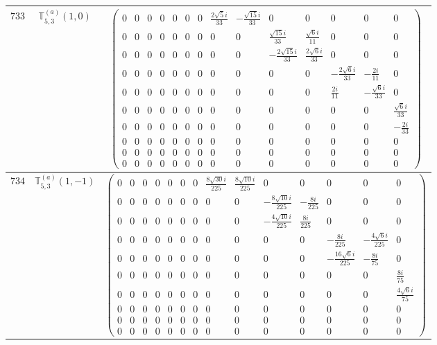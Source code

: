 \documentclass[fleqn,8pt,landscape]{jsarticle}
\begin{document}
\begin{center}
\begin{longtable}{ccc}
$ 733 $ & $ \mathbb{T}_{5,3}^{(a)}(1,0) $ & $ \begin{pmatrix} 0 & 0 & 0 & 0 & 0 & 0 & 0 & \frac{2 \sqrt{5} i}{33} & - \frac{\sqrt{15} i}{33} & 0 & 0 & 0 & 0 & 0 \\ 0 & 0 & 0 & 0 & 0 & 0 & 0 & 0 & 0 & \frac{\sqrt{15} i}{33} & \frac{\sqrt{6} i}{11} & 0 & 0 & 0 \\ 0 & 0 & 0 & 0 & 0 & 0 & 0 & 0 & 0 & - \frac{2 \sqrt{15} i}{33} & \frac{2 \sqrt{6} i}{33} & 0 & 0 & 0 \\ 0 & 0 & 0 & 0 & 0 & 0 & 0 & 0 & 0 & 0 & 0 & - \frac{2 \sqrt{6} i}{33} & - \frac{2 i}{11} & 0 \\ 0 & 0 & 0 & 0 & 0 & 0 & 0 & 0 & 0 & 0 & 0 & \frac{2 i}{11} & - \frac{\sqrt{6} i}{33} & 0 \\ 0 & 0 & 0 & 0 & 0 & 0 & 0 & 0 & 0 & 0 & 0 & 0 & 0 & \frac{\sqrt{6} i}{33} \\ 0 & 0 & 0 & 0 & 0 & 0 & 0 & 0 & 0 & 0 & 0 & 0 & 0 & - \frac{2 i}{33} \\ 0 & 0 & 0 & 0 & 0 & 0 & 0 & 0 & 0 & 0 & 0 & 0 & 0 & 0 \\ 0 & 0 & 0 & 0 & 0 & 0 & 0 & 0 & 0 & 0 & 0 & 0 & 0 & 0 \\ 0 & 0 & 0 & 0 & 0 & 0 & 0 & 0 & 0 & 0 & 0 & 0 & 0 & 0 \end{pmatrix} $ \\ \hline
$ 734 $ & $ \mathbb{T}_{5,3}^{(a)}(1,-1) $ & $ \begin{pmatrix} 0 & 0 & 0 & 0 & 0 & 0 & 0 & \frac{8 \sqrt{30} i}{225} & \frac{8 \sqrt{10} i}{225} & 0 & 0 & 0 & 0 & 0 \\ 0 & 0 & 0 & 0 & 0 & 0 & 0 & 0 & 0 & - \frac{8 \sqrt{10} i}{225} & - \frac{8 i}{225} & 0 & 0 & 0 \\ 0 & 0 & 0 & 0 & 0 & 0 & 0 & 0 & 0 & - \frac{4 \sqrt{10} i}{225} & \frac{8 i}{225} & 0 & 0 & 0 \\ 0 & 0 & 0 & 0 & 0 & 0 & 0 & 0 & 0 & 0 & 0 & - \frac{8 i}{225} & - \frac{4 \sqrt{6} i}{225} & 0 \\ 0 & 0 & 0 & 0 & 0 & 0 & 0 & 0 & 0 & 0 & 0 & - \frac{16 \sqrt{6} i}{225} & - \frac{8 i}{75} & 0 \\ 0 & 0 & 0 & 0 & 0 & 0 & 0 & 0 & 0 & 0 & 0 & 0 & 0 & \frac{8 i}{75} \\ 0 & 0 & 0 & 0 & 0 & 0 & 0 & 0 & 0 & 0 & 0 & 0 & 0 & \frac{4 \sqrt{6} i}{75} \\ 0 & 0 & 0 & 0 & 0 & 0 & 0 & 0 & 0 & 0 & 0 & 0 & 0 & 0 \\ 0 & 0 & 0 & 0 & 0 & 0 & 0 & 0 & 0 & 0 & 0 & 0 & 0 & 0 \\ 0 & 0 & 0 & 0 & 0 & 0 & 0 & 0 & 0 & 0 & 0 & 0 & 0 & 0 \end{pmatrix} $ \\ \hline

\end{longtable}
\end{center}
\end{document}
